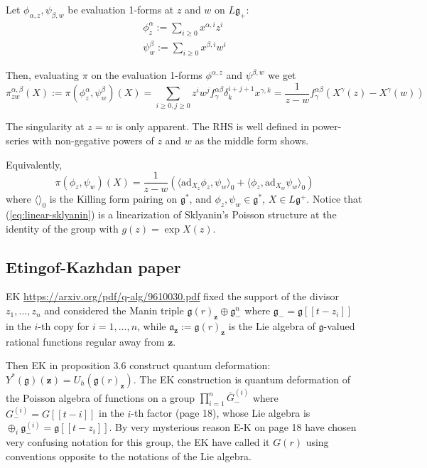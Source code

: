 \documentclass[11pt, oneside, reqno]{amsart}
\theoremstyle{definition} \newtheorem{definition}{Definition}[section]
\theoremstyle{definition} \newtheorem{remark}[definition]{Remark}
\theoremstyle{definition} \newtheorem{remarks}[definition]{Remarks}
\theoremstyle{definition} \newtheorem{question}[definition]{Question}
\theoremstyle{definition} \newtheorem*{note}{Note}
\theoremstyle{definition} \newtheorem{example}[definition]{Example}
\theoremstyle{definition} \newtheorem{examples}[definition]{Examples}
\renewcommand{\gg}{\mathfrak{g}}
\begin{document}
Let $\phi_{\alpha,z}, \psi_{\beta, w}$ be  evaluation 1-forms at $z$  and $w$ on $L \gg_{+}$:
\begin{equation}
  \begin{aligned}
  \phi^{\alpha}_{z} := \sum_{i \geq 0} x^{\alpha, i} z^{i}\\
  \psi^{\beta}_{w} := \sum_{i \geq 0} x^{\beta, i} w^{i}
  \end{aligned}
\end{equation}

Then, evaluating $\pi$ on the evaluation 1-forms $\phi^{\alpha, z}$ and
$\psi^{\beta, w}$ we get
\begin{equation}
  \pi^{\alpha, \beta}_{z w}  (X) := \pi(\phi^{\alpha}_{z}, \psi^{\beta}_{w})(X) = \sum_{i \geq 0, j \geq 0} z^{i} w^{j} f^{\alpha \beta}_{\gamma} \delta ^{i + j +1}_{k} x^{\gamma, k}  = \frac{1}{z - w} f^{\alpha \beta}_{\gamma} (X^{\gamma}(z)  - X^{\gamma}(w)) 
\end{equation}


The singularity at $z = w$ is only apparent. The RHS is well defined in power-series with non-gegative powers of $z$ and $w$ as the middle form shows.

Equivalently,
\begin{equation}
\label{eq:linear-sklyanin}
  \pi(\phi_z, \psi_{w})(X) = \frac{1}{z - w} \left ( \langle \mathrm{ad}_{X_z} \phi_z, \psi_w \rangle_0 + \langle \phi_{z},  \mathrm{ad}_{X_w} \psi_{w}\rangle_0 \right)
\end{equation}
where $\langle \rangle_0$ is the Killing form pairing on $\gg^{*}$,
and $\phi_z, \psi_{w} \in \gg^{*}$, $X \in L \gg^{+}$. Notice
that (\ref{eq:linear-sklyanin}) is a linearization of Sklyanin's
Poisson structure at the identity of the group with $g(z) = \exp X(z)$.



\subsection{Etingof-Kazhdan paper}
EK \url{https://arxiv.org/pdf/q-alg/9610030.pdf} fixed
the support of the divisor $z_1,\dots, z_n$ and considered
the Manin triple $\gg(r)_{\mathbf{z}} \oplus  \gg_{-}^{n}$
where $\gg_{-} = \gg[[t-z_i]]$ in the $i$-th copy for $i = 1, \dots, n$,
while $\mathfrak{a}_{\mathbf{z}} := \gg(r)_{\mathbf{z}}$ is the Lie algebra of $\gg$-valued
rational functions regular away from $\mathbf{z}$.

Then EK in proposition 3.6 construct quantum deformation: $Y^{*}(\gg)(\mathbf{z}) = U_h(\gg(r)_{\mathbf{z}})$. The EK construction is quantum deformation of the Poisson algebra of functions on a group $\prod_{i=1}^{n} \bar G_{-}^{(i)}$ where $G_{-}^{(i)} = G[[t-i]]$ in the $i$-th factor (page 18), whose Lie algebra is $\oplus_{i} \gg_{-}^{(i)} = \gg[[t-z_i]]$.  By very mysterious reason E-K on page 18 have chosen very confusing notation for this group, the EK have called it $G(r)$ using conventions opposite to the notations of the Lie algebra. 
\end{document}

